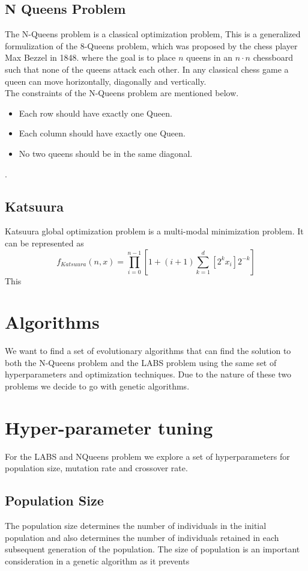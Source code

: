 \documentclass{article}
\begin{document}
\subsection{N Queens Problem}\label{sec:nqueens}
The N-Queens problem is a classical optimization problem, This is a generalized formulization of the 8-Queens problem, which was proposed by the chess player Max Bezzel in 1848. where the goal is to place $n$ queens in an $n \cdot n$ chessboard such that none of the queens attack each other. In any classical chess game a queen can move horizontally, diagonally and vertically. \\ 
The constraints of the N-Queens problem are mentioned below. 
\begin{itemize}
    \item Each row should have exactly one Queen. 
    \item Each column should have exactly one Queen.
    \item No two queens should be in the same diagonal.
\end{itemize} \cite{n_queens}. 

\subsection{Katsuura}
Katsuura global optimization problem is a multi-modal minimization problem. It can be represented as 
\begin{equation*}
     f_{Katsuura}(n, x) = \prod_{i=0}^{n-1} [1 + (i + 1) \sum_{k=1}^{d} [2^kx_i] 2^{-k}]
\end{equation*}
This 
\section{Algorithms}
\label{sec:imple}
We want to find a set of evolutionary algorithms that can find the solution to both the N-Queens problem and the LABS problem using the same set of hyperparameters and optimization techniques. Due to the nature of these two problems we decide to go with genetic algorithms.  



\section{Hyper-parameter tuning}
For the LABS and NQueens problem we explore a set of hyperparameters for population size, mutation rate and crossover rate.

\subsection{Population Size}
The population size determines the number of individuals in the initial population and also determines the number of individuals retained in each subsequent generation of the population. The size of population is an important consideration in a genetic algorithm as it prevents 
\end{document}
